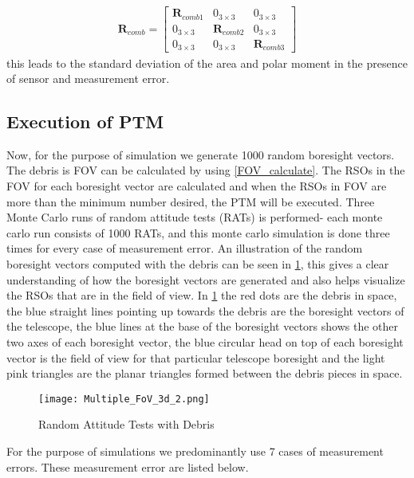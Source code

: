 \documentclass[]{aiaa-tc}%
\begin{document}
\begin{align}
\textbf{R}_{comb} = 
\begin{bmatrix}
\textbf{R}_{comb1} & 0_{3 \times 3} & 0_{3 \times 3}\\
0_{3 \times 3} & \textbf{R}_{comb2}  & 0_{3 \times 3}\\
0_{3 \times 3} & 0_{3 \times 3} & \textbf{R}_{comb3}
\end{bmatrix}
\end{align}
this leads to the standard deviation of the area and polar moment in the presence of sensor and measurement error.\\

\subsection{Execution of PTM}

Now, for the purpose of simulation we generate 1000 random boresight vectors. The debris is FOV can be calculated by using  \cref{FOV_calculate}. The RSOs in the FOV for each boresight vector are calculated and when the RSOs in FOV are more than the minimum number desired, the PTM will be executed. Three Monte Carlo runs of random attitude tests (RATs) is performed- each monte carlo run consists of 1000 RATs, and this monte carlo simulation is done three times for every case of measurement error. An illustration of the random boresight vectors computed with the debris can be seen in \cref{3D_FOV}, this gives a clear understanding of how the boresight vectors are generated and also helps visualize the RSOs that are in the field of view. In \cref{3D_FOV} the red dots are the debris in space, the blue straight lines pointing up towards the debris are the boresight vectors of the telescope, the blue lines at the base of the boresight vectors shows the other two axes of each boresight vector, the blue circular head on top of each boresight vector is the field of view for that particular telescope boresight and the light pink triangles are the planar triangles formed between the debris pieces in space.\\

\begin{figure}[h!]
\centering
\texttt{[image: Multiple\_FoV\_3d\_2.png]}
\caption{Random Attitude Tests with Debris}
\label{3D_FOV}
\end{figure}

For the purpose of simulations we predominantly use 7 cases of measurement errors. These measurement error are listed below.
\end{document}

